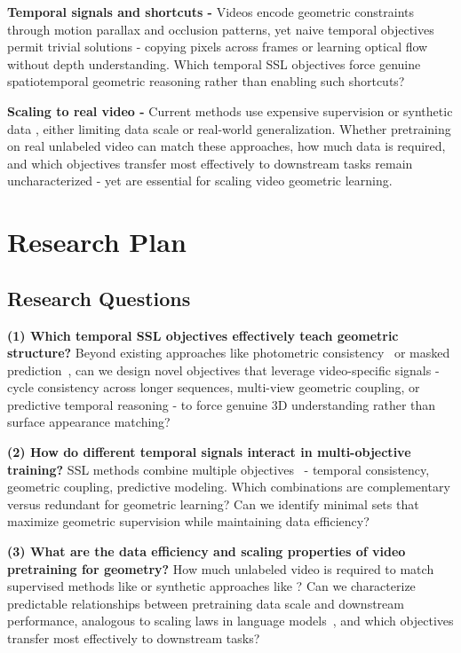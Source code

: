\documentclass{article}
\begin{document}
\textbf{Temporal signals and shortcuts - }Videos encode geometric constraints through motion parallax and occlusion patterns, yet naive temporal objectives permit trivial solutions - copying pixels across frames or learning optical flow without depth understanding. Which temporal SSL objectives force genuine spatiotemporal geometric reasoning rather than enabling such shortcuts?

\textbf{Scaling to real video - }Current methods use expensive supervision \cite{vggt} or synthetic data \cite{geo4d}, either limiting data scale or real-world generalization. Whether pretraining on real unlabeled video can match these approaches, how much data is required, and which objectives transfer most effectively to downstream tasks remain uncharacterized - yet are essential for scaling video geometric learning.

\section{Research Plan}

\subsection{Research Questions}

\textbf{(1) Which temporal SSL objectives effectively teach geometric structure?} Beyond existing approaches like photometric consistency~\cite{godard2019} or masked prediction~\cite{videomae}, can we design novel objectives that leverage video-specific signals - cycle consistency across longer sequences, multi-view geometric coupling, or predictive temporal reasoning - to force genuine 3D understanding rather than surface appearance matching?

\textbf{(2) How do different temporal signals interact in multi-objective training?} SSL methods combine multiple objectives~\cite{dino,videomae} - temporal consistency, geometric coupling, predictive modeling. Which combinations are complementary versus redundant for geometric learning? Can we identify minimal sets that maximize geometric supervision while maintaining data efficiency?

\textbf{(3) What are the data efficiency and scaling properties of video pretraining for geometry?} How much unlabeled video is required to match supervised methods like \cite{vggt} or synthetic approaches like \cite{geo4d}? Can we characterize predictable relationships between pretraining data scale and downstream performance, analogous to scaling laws in language models~\cite{scaling_laws}, and which objectives transfer most effectively to downstream tasks?
\end{document}

